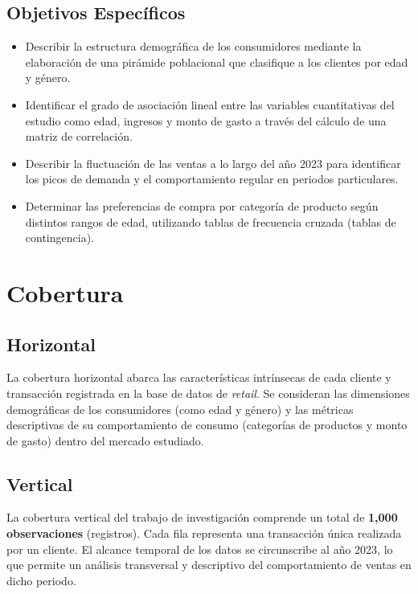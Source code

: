 \documentclass[oneside,11pt]{Latex/Classes/PhDthesisPSnPDF}
\begin{document}
\subsection{Objetivos Específicos}
\begin{itemize}
  \item{Describir la estructura demográfica de los consumidores mediante la elaboración de una pirámide poblacional que clasifique a los clientes por edad y género.}
  \item{Identificar el grado de asociación lineal entre las variables cuantitativas del estudio como edad, ingresos y monto de gasto a través del cálculo de una matriz de correlación.}
  \item{Describir la fluctuación de las ventas a lo largo del año 2023 para identificar los picos de demanda y el comportamiento regular en periodos particulares.}
  \item{Determinar las preferencias de compra por categoría de producto según distintos rangos de edad, utilizando tablas de frecuencia cruzada (tablas de contingencia).}
\end{itemize}

\section{Cobertura}

\subsection{Horizontal}

La cobertura horizontal abarca las características intrínsecas de cada
cliente y transacción registrada en la base de datos de \emph{retail}.
Se consideran las dimensiones demográficas de los consumidores (como
edad y género) y las métricas descriptivas de su comportamiento de
consumo (categorías de productos y monto de gasto) dentro del mercado
estudiado.

\subsection{Vertical}

La cobertura vertical del trabajo de investigación comprende un total de
\textbf{1,000 observaciones} (registros). Cada fila representa una
transacción única realizada por un cliente. El alcance temporal de los
datos se circunscribe al año 2023, lo que permite un análisis
transversal y descriptivo del comportamiento de ventas en dicho periodo.
\end{document}
